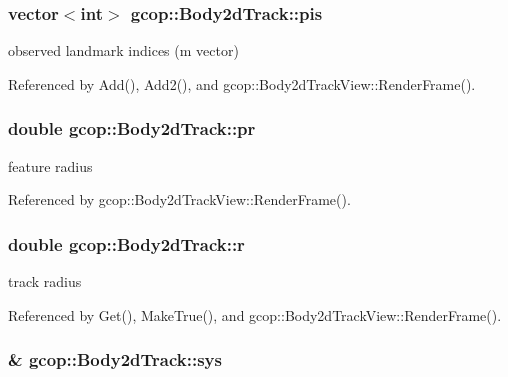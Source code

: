 \subsubsection[{pis}]{\setlength{\rightskip}{0pt plus 5cm}vector$<$int$>$ {\bf gcop\-::\-Body2d\-Track\-::pis}}\label{classgcop_1_1Body2dTrack_a2dcf980820f857fe8fadc9d6b472c226}


observed landmark indices (m vector) 



\-Referenced by \-Add(), \-Add2(), and gcop\-::\-Body2d\-Track\-View\-::\-Render\-Frame().

\subsubsection[{pr}]{\setlength{\rightskip}{0pt plus 5cm}double {\bf gcop\-::\-Body2d\-Track\-::pr}}\label{classgcop_1_1Body2dTrack_a44ea2f0bab92d35a1f5b201473d9fa22}


feature radius 



\-Referenced by gcop\-::\-Body2d\-Track\-View\-::\-Render\-Frame().

\subsubsection[{r}]{\setlength{\rightskip}{0pt plus 5cm}double {\bf gcop\-::\-Body2d\-Track\-::r}}\label{classgcop_1_1Body2dTrack_aee6ef7bc1c2edea9eb98d819453ee27f}


track radius 



\-Referenced by \-Get(), \-Make\-True(), and gcop\-::\-Body2d\-Track\-View\-::\-Render\-Frame().

\subsubsection[{sys}]{\& {\bf gcop\-::\-Body2d\-Track\-::sys}}\label{classgcop_1_1Body2dTrack_aef8b2e0d3511afd10197d57be65aa749}


